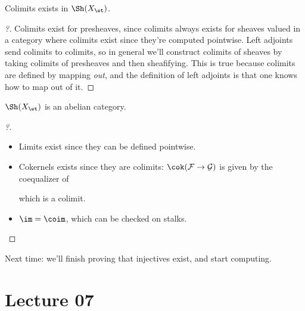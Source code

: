 \begin{corollary}[?]

Colimits exists in \(\Sh(X_\et)\).

\end{corollary}

\begin{proof}[?]

Colimits exist for presheaves, since colimits always exists for sheaves
valued in a category where colimits exist since they're computed
pointwise. Left adjoints send colimits to colimits, so in general we'll
construct colimits of sheaves by taking colimits of presheaves and then
sheafifying. This is true because colimits are defined by mapping
\emph{out}, and the definition of left adjoints is that one knows how to
map out of it.

\end{proof}

\begin{corollary}

\(\Sh(X_\et)\) is an abelian category.

\end{corollary}

\begin{proof}[?]

\envlist

\begin{itemize}
\item
  Limits exist since they can be defined pointwise.
\item
  Cokernels exists since they are colimits:
  \(\cok(\mathcal{F} \to \mathcal{G})\) is given by the coequalizer of

  \begin{center}
  \end{center}

  which is a colimit.
\item
  \(\im = \coim\), which can be checked on stalks.
\end{itemize}

\end{proof}

Next time: we'll finish proving that injectives exist, and start
computing.

\hypertarget{lecture-07}{%
\section{Lecture 07}\label{lecture-07}}

